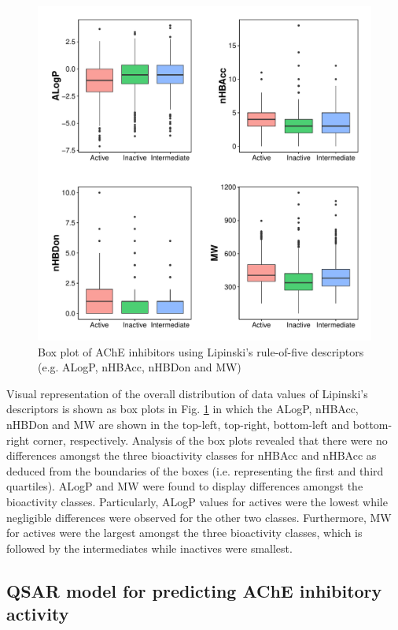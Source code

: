 \documentclass[fleqn,10pt]{wlpeerj}
\begin{document}
\begin{figure}[!ht]
\centering
\includegraphics[width = \linewidth]{Fig_Lipinski_Box_Plot_Review}
\caption{Box plot of AChE inhibitors using Lipinski's rule-of-five descriptors (e.g. ALogP, nHBAcc, nHBDon and MW)} 
\label{fig:space_2} 
\end{figure}

Visual representation of the overall distribution of data values of Lipinski's descriptors is shown as box plots in Fig. \ref{fig:space_2} in which the ALogP, nHBAcc, nHBDon and MW are shown in the top-left, top-right, bottom-left and bottom-right corner, respectively. Analysis of the box plots revealed that there were no differences amongst the three bioactivity classes for nHBAcc and nHBAcc as deduced from the boundaries of the boxes (i.e. representing the first and third quartiles). ALogP and MW were found to display differences amongst the bioactivity classes. Particularly, ALogP values for actives were the lowest while negligible differences were observed for the other two classes. Furthermore, MW for actives were the largest amongst the three bioactivity classes, which is followed by the intermediates while inactives were smallest. 


\subsection*{QSAR model for predicting AChE inhibitory activity}
\end{document}
